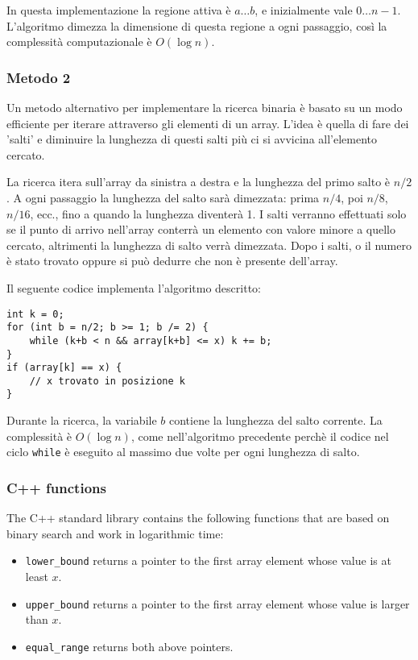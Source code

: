 In questa implementazione la regione attiva è $a \ldots b$,
e inizialmente vale $0 \ldots n-1$.
L'algoritmo dimezza la dimensione di questa regione a ogni passaggio,
così la complessità computazionale è $O(\log n)$.

\subsubsection{Metodo 2}

Un metodo alternativo per implementare la ricerca binaria
è basato su un modo efficiente per iterare attraverso gli 
elementi di un array.
L'idea è quella di fare dei 'salti' e diminuire la lunghezza
di questi salti più ci si avvicina all'elemento cercato.

La ricerca itera sull'array da sinistra a destra e la lunghezza del primo 
salto è $n/2$.
A ogni passaggio la lunghezza del salto sarà dimezzata:
prima $n/4$, poi $n/8$, $n/16$, ecc., fino a quando la lunghezza
diventerà 1. I salti verranno effettuati solo se il punto di arrivo
nell'array conterrà un elemento con valore minore a quello cercato,
altrimenti la lunghezza di salto verrà dimezzata.
Dopo i salti, o il numero è stato trovato oppure si
può dedurre che non è presente dell'array.

Il seguente codice implementa l'algoritmo descritto:
\begin{lstlisting}
int k = 0;
for (int b = n/2; b >= 1; b /= 2) {
    while (k+b < n && array[k+b] <= x) k += b;
}
if (array[k] == x) {
    // x trovato in posizione k
}
\end{lstlisting}

Durante la ricerca, la variabile $b$
contiene la lunghezza del salto corrente.
La complessità è $O(\log n)$, come nell'algoritmo 
precedente perchè il codice nel ciclo \texttt{while} 
è eseguito al massimo due volte per ogni lunghezza di salto.

\subsubsection{C++ functions}

The C++ standard library contains the following functions
that are based on binary search and work in logarithmic time:

\begin{itemize}
\item \texttt{lower\_bound} returns a pointer to the
first array element whose value is at least $x$.
\item \texttt{upper\_bound} returns a pointer to the
first array element whose value is larger than $x$.
\item \texttt{equal\_range} returns both above pointers.
\end{itemize}

